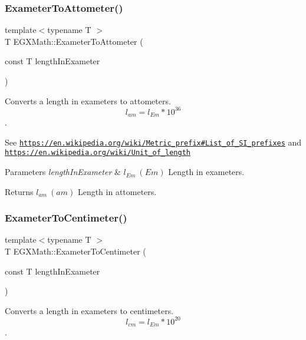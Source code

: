 \subsubsection{\texorpdfstring{Exameter\+To\+Attometer()}{ExameterToAttometer()}}
{\footnotesize\ttfamily template$<$typename T $>$ \\
T E\+G\+X\+Math\+::\+Exameter\+To\+Attometer (\begin{DoxyParamCaption}\item[{const T}]{length\+In\+Exameter }\end{DoxyParamCaption})}



Converts a length in exameters to attometers. \[ l_{am}=l_{Em} * 10^{36} \]. 

See \href{https://en.wikipedia.org/wiki/Metric_prefix#List_of_SI_prefixes}{\tt https\+://en.\+wikipedia.\+org/wiki/\+Metric\+\_\+prefix\#\+List\+\_\+of\+\_\+\+S\+I\+\_\+prefixes} and \href{https://en.wikipedia.org/wiki/Unit_of_length}{\tt https\+://en.\+wikipedia.\+org/wiki/\+Unit\+\_\+of\+\_\+length} 
\begin{DoxyParams}{Parameters}
{\em length\+In\+Exameter} & $ l_{Em}\ (Em)$ Length in exameters. \\
\hline
\end{DoxyParams}
\begin{DoxyReturn}{Returns}
$ l_{am}\ (am)$ Length in attometers. 
\end{DoxyReturn}
\mbox{\label{group___e_g_x_math-_conversions-_length_conversions-_exameter-_s_i_ga6f379e6cd3c3523fb3ff16eadcbefba9}} 
\subsubsection{\texorpdfstring{Exameter\+To\+Centimeter()}{ExameterToCentimeter()}}
{\footnotesize\ttfamily template$<$typename T $>$ \\
T E\+G\+X\+Math\+::\+Exameter\+To\+Centimeter (\begin{DoxyParamCaption}\item[{const T}]{length\+In\+Exameter }\end{DoxyParamCaption})}



Converts a length in exameters to centimeters. \[ l_{cm}=l_{Em} * 10^{20} \]. 

